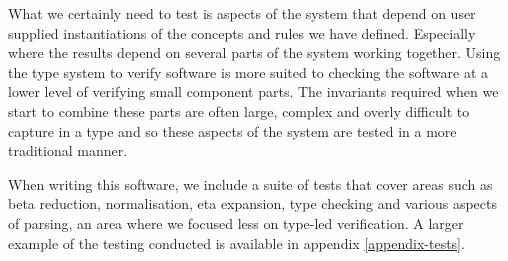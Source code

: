 What we certainly need to test is aspects of the system that depend on
user supplied instantiations of the concepts and rules we have
defined. Especially where the results depend on several parts of the
system working together. Using the type system to verify software is
more suited to checking the software at a lower level of verifying
small component parts. The invariants required when we start to
combine these parts are often large, complex and overly difficult to
capture in a type and so these aspects of the system are tested in a
more traditional manner.

When writing this software, we include a suite of tests that cover
areas such as beta reduction, normalisation, eta expansion, type
checking and various aspects of parsing, an area where we
focused less on type-led verification. A larger example of the testing
conducted is available in appendix \ref{appendix-tests}.
